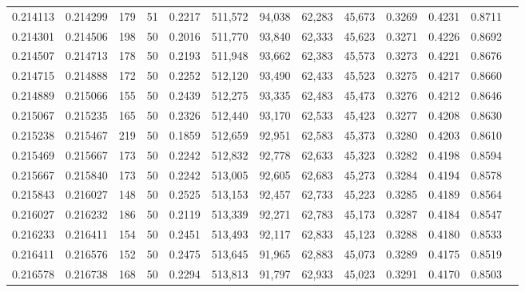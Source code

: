 \begin{tabular}{rrrrrrrrrrrrr}
0.214113 & 0.214299 &   179 &  51 &                                     0.2217 & 511,572 &  94,038 &  62,283 &  45,673 & 0.3269 & 0.4231 & 0.8711 \\
0.214301 & 0.214506 &   198 &  50 &                                     0.2016 & 511,770 &  93,840 &  62,333 &  45,623 & 0.3271 & 0.4226 & 0.8692 \\
0.214507 & 0.214713 &   178 &  50 &                                     0.2193 & 511,948 &  93,662 &  62,383 &  45,573 & 0.3273 & 0.4221 & 0.8676 \\
0.214715 & 0.214888 &   172 &  50 &                                     0.2252 & 512,120 &  93,490 &  62,433 &  45,523 & 0.3275 & 0.4217 & 0.8660 \\
0.214889 & 0.215066 &   155 &  50 &                                     0.2439 & 512,275 &  93,335 &  62,483 &  45,473 & 0.3276 & 0.4212 & 0.8646 \\
0.215067 & 0.215235 &   165 &  50 &                                     0.2326 & 512,440 &  93,170 &  62,533 &  45,423 & 0.3277 & 0.4208 & 0.8630 \\
0.215238 & 0.215467 &   219 &  50 &                                     0.1859 & 512,659 &  92,951 &  62,583 &  45,373 & 0.3280 & 0.4203 & 0.8610 \\
0.215469 & 0.215667 &   173 &  50 &                                     0.2242 & 512,832 &  92,778 &  62,633 &  45,323 & 0.3282 & 0.4198 & 0.8594 \\
0.215667 & 0.215840 &   173 &  50 &                                     0.2242 & 513,005 &  92,605 &  62,683 &  45,273 & 0.3284 & 0.4194 & 0.8578 \\
0.215843 & 0.216027 &   148 &  50 &                                     0.2525 & 513,153 &  92,457 &  62,733 &  45,223 & 0.3285 & 0.4189 & 0.8564 \\
0.216027 & 0.216232 &   186 &  50 &                                     0.2119 & 513,339 &  92,271 &  62,783 &  45,173 & 0.3287 & 0.4184 & 0.8547 \\
0.216233 & 0.216411 &   154 &  50 &                                     0.2451 & 513,493 &  92,117 &  62,833 &  45,123 & 0.3288 & 0.4180 & 0.8533 \\
0.216411 & 0.216576 &   152 &  50 &                                     0.2475 & 513,645 &  91,965 &  62,883 &  45,073 & 0.3289 & 0.4175 & 0.8519 \\
0.216578 & 0.216738 &   168 &  50 &                                     0.2294 & 513,813 &  91,797 &  62,933 &  45,023 & 0.3291 & 0.4170 & 0.8503 \\

\end{tabular}
